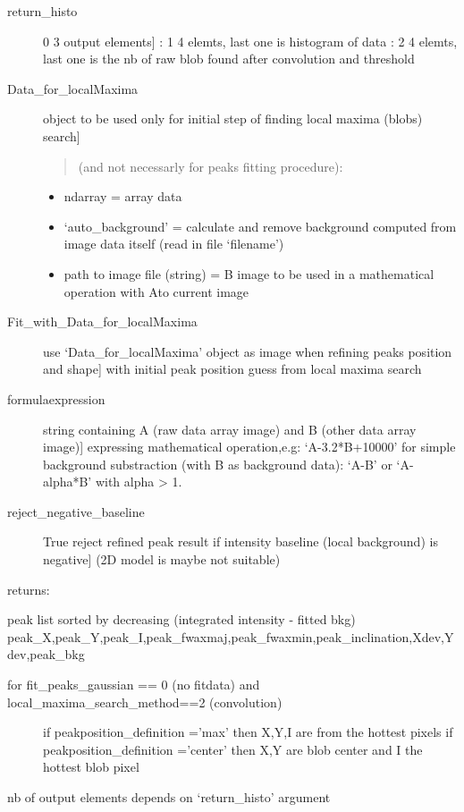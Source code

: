 \documentclass[letterpaper,10pt,english]{sphinxmanual}
\begin{document}
\begin{fulllineitems}
\begin{description}
\item[{return\_histo}] \leavevmode{[}0   3 output elements{]}
: 1   4 elemts, last one is histogram of data
: 2   4 elemts, last one is the nb of raw blob found after convolution and threshold

\item[{Data\_for\_localMaxima}] \leavevmode{[}object to be used only for initial step of finding local maxima (blobs) search{]}\begin{quote}

(and not necessarly for peaks fitting procedure):
\end{quote}
\begin{itemize}
\item {} 
ndarray     = array data

\item {} 
‘auto\_background’  = calculate and remove background computed from image data itself (read in file ‘filename’)

\item {} 
path to image file (string)  = B image to be used in a mathematical operation with Ato current image

\end{itemize}

\item[{Fit\_with\_Data\_for\_localMaxima}] \leavevmode{[}use ‘Data\_for\_localMaxima’ object as image when refining peaks position and shape{]}
with initial peak position guess from local maxima search

\item[{formulaexpression}] \leavevmode{[}string containing A (raw data array image) and B (other data array image){]}
expressing mathematical operation,e.g:
‘A-3.2*B+10000’
for simple background substraction (with B as background data):
‘A-B’ or ‘A-alpha*B’ with alpha \textgreater{} 1.

\item[{reject\_negative\_baseline}] \leavevmode{[}True  reject refined peak result if intensity baseline (local background) is negative{]}
(2D model is maybe not suitable)

\end{description}

returns:

peak list sorted by decreasing (integrated intensity - fitted bkg)
peak\_X,peak\_Y,peak\_I,peak\_fwaxmaj,peak\_fwaxmin,peak\_inclination,Xdev,Ydev,peak\_bkg
\begin{description}
\item[{for fit\_peaks\_gaussian == 0 (no fitdata) and local\_maxima\_search\_method==2 (convolution)}] \leavevmode
if peakposition\_definition =’max’ then X,Y,I are from the hottest pixels
if peakposition\_definition =’center’ then X,Y are blob center and I the hottest blob pixel

\end{description}

nb of output elements depends on ‘return\_histo’ argument

\end{fulllineitems}
\end{document}
